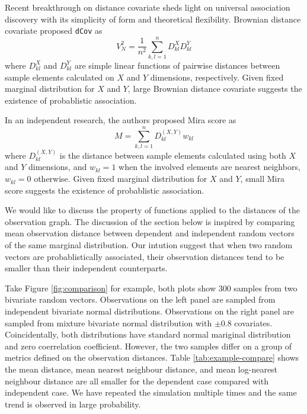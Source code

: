 \documentclass{sig-alternate}
\begin{document}
Recent breakthrough on distance covariate \cite{székely2009,
  székely2007} sheds light on universal association discovery with
its simplicity of form and theoretical flexibility. Brownian distance
\cite{székely2009} covariate proposed \texttt{dCov} as
\begin{equation*}
  V_N^2 = \frac{1}{n^2}\sum_{k,l=1}^n D^{X}_{kl}D^{Y}_{kl}
\end{equation*}
where $D^{X}_{kl}$ and $D^{Y}_{kl}$ are simple linear functions of
pairwise distances between sample elements calculated on $X$ and $Y$
dimensions, respectively. Given fixed marginal distribution for $X$
and $Y$, large Brownian distance covariate suggests the existence
of probablistic association. 

In an independent research, the authors proposed Mira score
\cite{my-dissertation} as
\begin{equation*}
  M = \sum_{k,l = 1}^n D^{(X,Y)}_{kl} w_{kl}
\end{equation*}
where $D^{(X,Y)}_{kl}$ is the distance between sample elements
calculated using both $X$ and $Y$ dimensions, and $w_{kl}=1$ when the
involved elements are nearest neighbors, $w_{kl}=0$ otherwise. Given
fixed marginal distribution for $X$ and $Y$, small Mira score suggests
the existence of probablistic association. 

We would like to discuss the property of functions applied to the
distances of the observation graph. The discussion of the section
below is inspired by comparing mean observation distance between
dependent and independent random vectors of the same marginal
distribution. Our intution suggest that when two random vectors are
probablistically associated, their observation distances tend to be
smaller than their independent counterparts.

Take Figure \ref{fig:comparison} for example, both plots show 300
samples from two bivariate random vectors. Observations on the left
panel are sampled from independent bivariate normal distributions.
Observations on the right panel are sampled from mixture bivariate
normal distribution with $\pm 0.8$ covariates. Coincidentally, both
distributions have standard normal mariginal distribution and zero
coerrelation coefficient. However, the two samples differ on a group
of metrics defined on the observation distances. Table
\ref{tab:example-compare} shows the mean distance, mean nearest
neighbour distance, and mean log-nearest neighbour distance are all
smaller for the dependent case compared with independent case. We have
repeated the simulation multiple times and the same trend is observed
in large probability.
\end{document}
